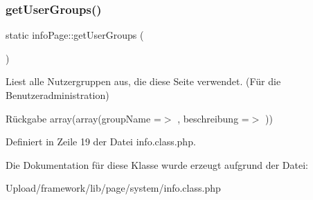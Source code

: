 \subsubsection{\texorpdfstring{get\+User\+Groups()}{getUserGroups()}}
{\footnotesize\ttfamily static info\+Page\+::get\+User\+Groups (\begin{DoxyParamCaption}{ }\end{DoxyParamCaption})\hspace{0.3cm}{\ttfamily [static]}}

Liest alle Nutzergruppen aus, die diese Seite verwendet. (Für die Benutzeradministration) \begin{DoxyReturn}{Rückgabe}
array(array(\textquotesingle{}group\+Name\textquotesingle{} =$>$ \textquotesingle{}\textquotesingle{}, \textquotesingle{}beschreibung\textquotesingle{} =$>$ \textquotesingle{}\textquotesingle{})) 
\end{DoxyReturn}


Definiert in Zeile 19 der Datei info.\+class.\+php.



Die Dokumentation für diese Klasse wurde erzeugt aufgrund der Datei\+:\begin{DoxyCompactItemize}
\item 
Upload/framework/lib/page/system/info.\+class.\+php\end{DoxyCompactItemize}

